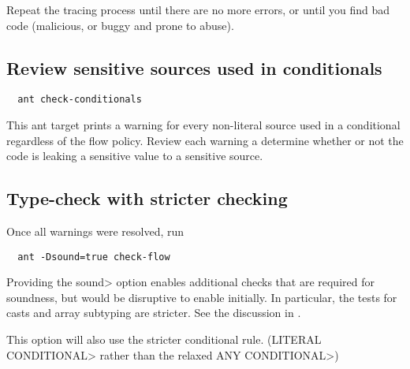 Repeat the tracing process until there are no more errors, or until you find bad code
(malicious, or buggy and prone to abuse).

\subsection{Review sensitive sources used in conditionals}
\begin{Verbatim}
  ant check-conditionals
\end{Verbatim}
This ant target prints a warning for every non-literal source used in a conditional regardless
of the flow policy.  Review each warning a determine whether or not the code is leaking a 
sensitive value to a sensitive source. 

\subsection{Type-check with stricter checking}

Once all warnings were resolved, run 

\begin{Verbatim}
  ant -Dsound=true check-flow
\end{Verbatim}

\noindent
Providing the \<sound> option enables additional checks that are
required for soundness, but would be disruptive to enable initially.
In particular, the tests for casts and array subtyping are stricter.
See the discussion in .

This option will also use the stricter conditional rule. (\<LITERAL
\flowsto{} CONDITIONAL> rather than the relaxed \<ANY \flowsto{} CONDITIONAL>)


